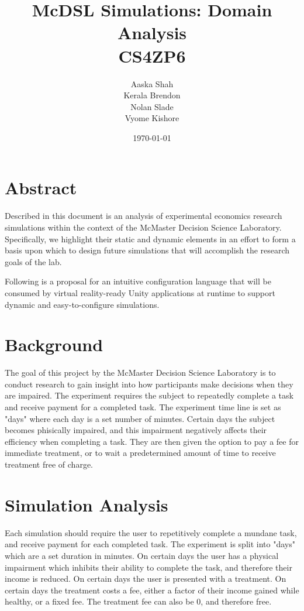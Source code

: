 \documentclass{article}
\title{\textbf{McDSL Simulations: Domain Analysis}\\CS4ZP6}
\author{Aaska Shah\\Kerala Brendon\\Nolan Slade\\Vyome Kishore}
\date{\today}
\begin{document}
\maketitle

\section*{Abstract}

Described in this document is an analysis of experimental economics research simulations within the context of the McMaster Decision Science Laboratory. Specifically, we highlight their static and dynamic elements in an effort to form a basis upon which to design future simulations that will accomplish the research goals of the lab.

Following is a proposal for an intuitive configuration language that will be consumed by virtual reality-ready Unity applications at runtime to support dynamic and easy-to-configure simulations.

\section{Background}
The goal of this project by the McMaster Decision Science Laboratory is to conduct research to gain insight into how participants make decisions when they are impaired. The experiment requires the subject to repeatedly complete a task and receive payment for a completed task. The experiment time line is set as "days" where each day is a set number of minutes. Certain days the subject becomes phisically impaired, and this impairment negatively affects their efficiency when completing a task. They are then given the option to pay a fee for immediate treatment, or to wait a predetermined amount of time to receive treatment free of charge.


\section*{Simulation Analysis}

Each simulation should require the user to repetitively complete a mundane task, and receive payment for each completed task. The experiment is split into "days" which are a set duration in minutes. On certain days the user has a physical impairment which inhibits their ability to complete the task, and therefore their income is reduced. On certain days the user is presented with a treatment. On certain days the treatment costs a fee, either a factor of their income gained while healthy, or a fixed fee. The treatment fee can also be 0, and therefore free.
\end{document}
